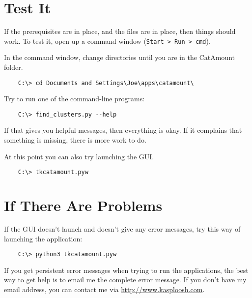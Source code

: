 \section{Test It}

If the prerequisites are in place, and the files are in place, then things
should work. To test it, open up a command window (\texttt{Start > Run > cmd}).

In the command window, change directories until you are in the CatAmount
folder.

\begin{verbatim}
    C:\> cd Documents and Settings\Joe\apps\catamount\
\end{verbatim}

Try to run one of the command-line programs:

\begin{verbatim}
    C:\> find_clusters.py --help
\end{verbatim}

If that gives you helpful messages, then everything is okay. If it complains
that something is missing, there is more work to do.

At this point you can also try launching the GUI.

\begin{verbatim}
    C:\> tkcatamount.pyw
\end{verbatim}

\section{If There Are Problems}

If the GUI doesn't launch and doesn't give any error messages, try this
way of launching the application:

\begin{verbatim}
    C:\> python3 tkcatamount.pyw
\end{verbatim}

If you get persistent error messages when trying to run the applications, the
best way to get help is to email me the complete error message. If you don't
have my email address, you can contact me via \url{http://www.kasploosh.com}.

